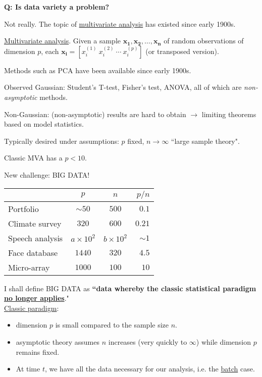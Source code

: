 \documentclass[twoside]{article}
\begin{document}
\textbf{Q: Is data variety a problem?}

Not really. The topic of \underline{multivariate analysis} has existed since early 1900s.

\underline{Multivariate analysis}. Given a sample $\mathbf{x_1,x_2,\dots,x_n}$ of random observations of dimension $p$, each $\mathbf{x_i}=[x_i^{(1)}\  x_i^{(2)}\ \cdots \  x_i^{(p)}]$ (or transposed version).

Methods such as PCA have been available since early 1900s.

Observed Gaussian: Student's T-test, Fisher's test, ANOVA, all of which are \emph{non-asymptotic} methods.

Non-Gaussian: (non-asymptotic) results are hard to obtain $\longrightarrow$ limiting theorems based on model statistics.

Typically desired under assumptions: $p$ fixed, $n\rightarrow \infty$ ``large sample theory".

Classic MVA has a $p<10$.

New challenge: BIG DATA!

\begin{center}	\begin{tabular}{|l|c|c|r|}
		\hline
		 & $p$ & $n$ & $p/n$ \\
		\hline
		Portfolio & $\sim 50$ & $500$ & $0.1$ \\
		\hline
		Climate survey & $320$ & $600$ & $0.21$ \\
		\hline
		Speech analysis & $a\times 10^2$ & $b\times 10^2$ & $\sim 1$ \\
		\hline
		Face database & $1440$ & $320$ & $4.5$ \\
		\hline
		Micro-array & $1000$ & $100$ & $10$ \\
		\hline
	\end{tabular}
\end{center}

I shall define BIG DATA as \textbf{``data whereby the classic statistical paradigm \underline{no longer applies}}."\\

\underline{Classic paradigm}:
\begin{itemize}
	\item dimension $p$ is small compared to the sample size $n$.
	\item asymptotic theory assumes $n$ increases (very quickly to $\infty$) while dimension $p$ remains fixed.
	\item At time $t$, we have all the data necessary for our analysis, i.e. the \underline{batch} case.
\end{itemize}
\end{document}
